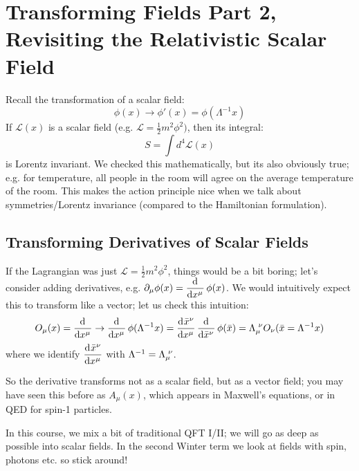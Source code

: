 \section{Transforming Fields Part 2, Revisiting the Relativistic Scalar Field}
Recall the transformation of a scalar field:
\begin{equation}
    \phi(x) \to \phi'(x) = \phi(\Lambda^{-1}x)
\end{equation}
If $\mathcal{L}(x)$ is a scalar field (e.g. $\mathcal{L} = \frac{1}{2}m^2\phi^2)$, then its integral:
\begin{equation}
    S = \int d^4\mathcal{L}(x)
\end{equation}
is Lorentz invariant. We checked this mathematically, but its also obviously true; e.g. for temperature, all people in the room will agree on the average temperature of the room. This makes the action principle nice when we talk about symmetries/Lorentz invariance (compared to the Hamiltonian formulation).

\subsection{Transforming Derivatives of Scalar Fields}
If the Lagrangian was just $\mathcal{L} = \frac{1}{2}m^2\phi^2$, things would be a bit boring; let's consider adding derivatives, e.g. $\p_\mu \phi(x) = \dod{}{x^\mu\phantom{}}\phi(x)$. We would intuitively expect this to transform like a vector; let us check this intuition:
\begin{equation}
    O_\mu(x) = \dod{}{x^\mu\phantom{}} \to \dod{}{x^\mu\phantom{}}\phi(\Lambda^{-1}x) = \dod{\bar{x}^\nu\phantom{}}{x^\mu\phantom{}}\dod{}{\bar{x}^\nu\phantom{}}\phi(\bar{x}) = \Lambda_\mu^{\sp \nu}O_\nu(\bar{x} = \Lambda^{-1}x)
\end{equation}
where we identify $\dod{\bar{x}^\nu\phantom{}}{x^\mu\phantom{}}$ with $\Lambda^{-1} = \Lambda_\mu^{\sp \nu}$. 

So the derivative transforms not as a scalar field, but as a vector field; you may have seen this before as $A_\mu(x)$, which appears in Maxwell's equations, or in QED for spin-1 particles.

In this course, we mix a bit of traditional QFT I/II; we will go as deep as possible into scalar fields. In the second Winter term we look at fields with spin, photons etc. so stick around!

